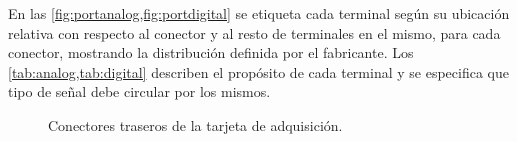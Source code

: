 En las \cref{fig:portanalog,fig:portdigital} se etiqueta cada terminal
según su ubicación relativa con respecto al conector y al resto de
terminales en el mismo, para cada conector, mostrando la distribución
definida por el fabricante. Los \cref{tab:analog,tab:digital} describen el
propósito de cada terminal y se especifica que tipo de señal debe circular
por los mismos.

\begin{figure}
    \begin{center}
	\vspace*{.1\textheight}
	\end{center}
	\caption[Conectores traseros de la tarjeta de adquisición]
	{Conectores traseros de la tarjeta de adquisición.}
	\label{fig:ports}
\end{figure}

\newlength\tablewidth
\setlength{}

